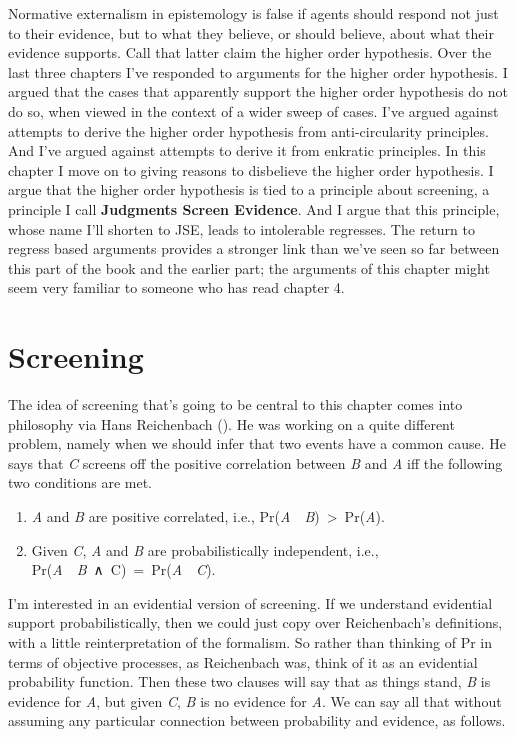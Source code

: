 \documentclass[
  10pt,
  letterpaper,
  twoside]{scrbook}
\providecommand{\tightlist}{%
  \setlength{\itemsep}{0pt}\setlength{\parskip}{0pt}}\usepackage{longtable,booktabs,array}
\begin{document}
Normative externalism in epistemology is false if agents should respond
not just to their evidence, but to what they believe, or should believe,
about what their evidence supports. Call that latter claim the higher
order hypothesis. Over the last three chapters I've responded to
arguments for the higher order hypothesis. I argued that the cases that
apparently support the higher order hypothesis do not do so, when viewed
in the context of a wider sweep of cases. I've argued against attempts
to derive the higher order hypothesis from anti-circularity principles.
And I've argued against attempts to derive it from enkratic principles.
In this chapter I move on to giving reasons to disbelieve the higher
order hypothesis. I argue that the higher order hypothesis is tied to a
principle about screening, a principle I call \textbf{Judgments Screen
Evidence}. And I argue that this principle, whose name I'll shorten to
JSE, leads to intolerable regresses. The return to regress based
arguments provides a stronger link than we've seen so far between this
part of the book and the earlier part; the arguments of this chapter
might seem very familiar to someone who has read chapter 4.

\section{Screening}\label{screening}

The idea of screening that's going to be central to this chapter comes
into philosophy via Hans Reichenbach
(). He was working on a quite
different problem, namely when we should infer that two events have a
common cause. He says that \emph{C} screens off the positive correlation
between \emph{B} and \emph{A} iff the following two conditions are met.

\begin{enumerate}
\def\labelenumi{\arabic{enumi}.}
\tightlist
\item
  \emph{A} and \emph{B} are positive correlated, i.e.,
  Pr(\emph{A}~\textbar~\emph{B})~\textgreater~Pr(\emph{A}).
\item
  Given \emph{C}, \emph{A} and \emph{B} are probabilistically
  independent, i.e.,
  Pr(\emph{A}~\textbar~\emph{B}~∧~C)~=~Pr(\emph{A}~\textbar~\emph{C}).
\end{enumerate}

I'm interested in an evidential version of screening. If we understand
evidential support probabilistically, then we could just copy over
Reichenbach's definitions, with a little reinterpretation of the
formalism. So rather than thinking of Pr in terms of objective
processes, as Reichenbach was, think of it as an evidential probability
function. Then these two clauses will say that as things stand, \emph{B}
is evidence for \emph{A}, but given \emph{C}, \emph{B} is no evidence
for \emph{A}. We can say all that without assuming any particular
connection between probability and evidence, as follows.
\end{document}
